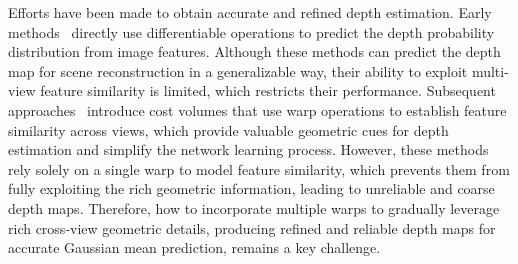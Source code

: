 Efforts have been made to obtain accurate and refined depth estimation.
%
Early methods~\cite{charatan2024pixelsplat, szymanowicz2024splatter} directly use differentiable operations to predict the depth probability distribution from image features.
%
Although these methods can predict the depth map for scene reconstruction in a generalizable way, their ability to exploit multi-view feature similarity is limited, which restricts their performance.
%
Subsequent approaches~\cite{chen2024mvsplat, liu2024mvsgaussian} introduce cost volumes that use warp operations to establish feature similarity across views, which provide valuable geometric cues for depth estimation and simplify the network learning process.
%
However, these methods rely solely on a single warp to model feature similarity, which prevents them from fully exploiting the rich geometric information, leading to unreliable and coarse depth maps.
% 
%
%
%
Therefore, how to incorporate multiple warps to gradually leverage rich cross-view geometric details, producing refined and reliable depth maps for accurate Gaussian mean prediction, remains a key challenge.
%


